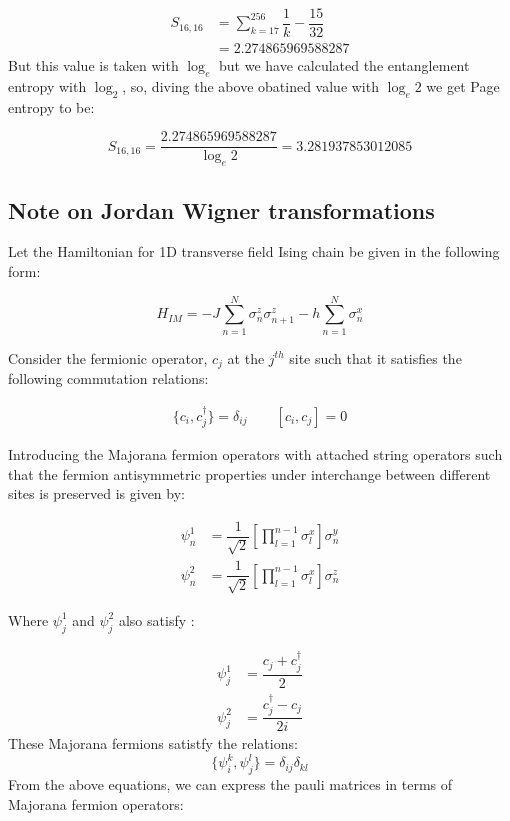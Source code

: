 \documentclass[11pt,a4paper]{article}
\begin{document}
			\begin{align}
			S_{16,16} &= \sum_{k = 17}^{256} \dfrac{1}{k} - \dfrac{15}{32}\\
			& = 2.274865969588287
\end{align}			 		  
		  But this value is taken with $\log_{e}$ but we have calculated the entanglement entropy with $\log_{2}$, so, diving the above obatined value with $\log_{e}2$ we get Page entropy to be:
		  
		  \begin{equation}
		  S_{16,16}  = \dfrac{2.274865969588287}{\log_{e}2} = 3.281937853012085
		  \end{equation}
		  
		 
        \subsection{Note on Jordan Wigner transformations}		 
		 
		
		
		
Let the Hamiltonian for 1D transverse field Ising chain be given in the following form:

\begin{equation}\label{spinh}
	H_{IM} = -J\sum_{n=1}^{N} \sigma^{z}_{n}\sigma^{z}_{n+1}  -h\sum_{n=1}^{N} \sigma^{x}_{n}
	\end{equation}

Consider the fermionic operator, $c_{j}$ at the $j^{th}$ site such that it satisfies the following commutation relations:

\begin{align}
\{c_{i},c_{j}^{\dagger}\} = \delta_{ij}\qquad
[c_{i},c_{j}] = 0
\end{align}
	
	Introducing the Majorana fermion operators with attached string operators such that the fermion antisymmetric properties under interchange between different sites is preserved is given by:
	
	\begin{align}
	\psi^{1}_{n} & = \dfrac{1}{\sqrt{2}}[ \prod_{l = 1}^{n-1}\sigma_{l}^{x}]\sigma_{n}^{y}\\
	\psi^{2}_{n} & = \dfrac{1}{\sqrt{2}}[ \prod_{l = 1}^{n-1}\sigma_{l}^{x}]\sigma_{n}^{z}
	\end{align} 
	
	Where $\psi^{1}_{j}$ and $\psi^{2}_{j}$ also satisfy :
	
	\begin{align}\label{m1}
	\psi^{1}_{j} &= \dfrac{c_{j}+c_{j}^{\dagger}}{2}\\
	\psi^{2}_{j} &= \dfrac{c_{j}^{\dagger}-c_{j}}{2i}
	\end{align}
	These Majorana fermions satistfy the relations:
	\begin{equation}
	\{ \psi_{i}^k,\psi_{j}^l \} = \delta_{ij}\delta_{kl}
	\end{equation}
	From the above equations, we can express the pauli matrices in terms of Majorana fermion operators:
	
\end{document}
